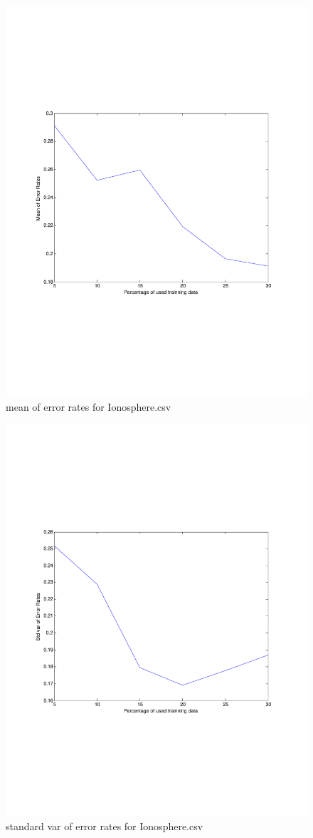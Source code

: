 \documentclass[12pt]{amsart}
\begin{document}
\begin{figure}[H]
\centering
        \includegraphics[totalheight=18cm]{Iono_mean_nbg.pdf}
    \caption{mean of error rates for Ionosphere.csv}
    \label{fig:verticalcell31}
\end{figure}

\begin{figure}[H]
\centering
        \includegraphics[totalheight=18cm]{Iono_std_nbg.pdf}
    \caption{standard var of error rates for Ionosphere.csv}
    \label{fig:verticalcell41}
\end{figure}
\end{document}
